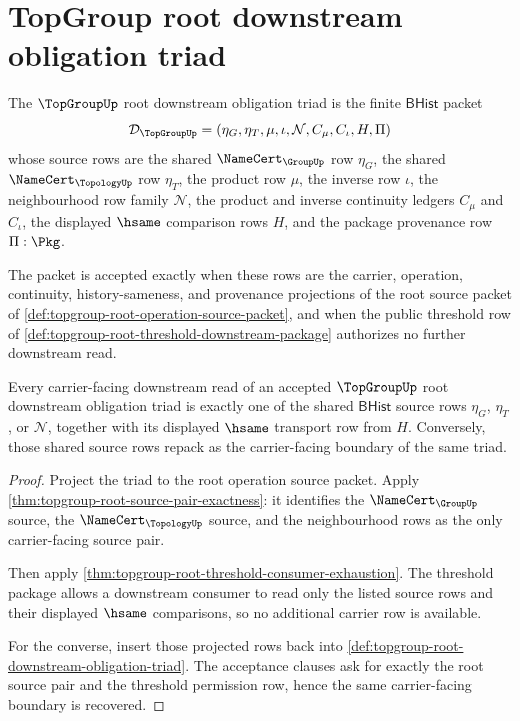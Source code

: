 \section{TopGroup root downstream obligation triad}
\label{sec:topgroup-root-downstream-obligation-triad}

\begin{definition}
\label{def:topgroup-root-downstream-obligation-triad}
The $\TopGroupUp$ root downstream obligation triad is the finite
$\mathsf{BHist}$ packet
$$
\mathcal{D}_{\TopGroupUp}
=
(\eta_G,\eta_T,\mu,\iota,\mathcal{N},C_{\mu},C_{\iota},H,\Pi)
$$
whose source rows are the shared $\NameCert_{\GroupUp}$ row $\eta_G$, the
shared $\NameCert_{\TopologyUp}$ row $\eta_T$, the product row $\mu$, the
inverse row $\iota$, the neighbourhood row family $\mathcal{N}$, the product
and inverse continuity ledgers $C_{\mu}$ and $C_{\iota}$, the displayed
$\hsame$ comparison rows $H$, and the package provenance row $\Pi:\Pkg$.

The packet is accepted exactly when these rows are the carrier, operation,
continuity, history-sameness, and provenance projections of the root source
packet of \autoref{def:topgroup-root-operation-source-packet}, and when the
public threshold row of
\autoref{def:topgroup-root-threshold-downstream-package} authorizes no further
downstream read.
\end{definition}

\begin{theorem}
\label{thm:topgroup-root-downstream-carrier-obligation}
Every carrier-facing downstream read of an accepted $\TopGroupUp$ root
downstream obligation triad is exactly one of the shared $\mathsf{BHist}$ source
rows $\eta_G$, $\eta_T$, or $\mathcal{N}$, together with its displayed $\hsame$
transport row from $H$. Conversely, those shared source rows repack as the
carrier-facing boundary of the same triad.
\end{theorem}
\begin{proof}
Project the triad to the root operation source packet. Apply
\autoref{thm:topgroup-root-source-pair-exactness}: it identifies the
$\NameCert_{\GroupUp}$ source, the $\NameCert_{\TopologyUp}$ source, and the
neighbourhood rows as the only carrier-facing source pair.

Then apply \autoref{thm:topgroup-root-threshold-consumer-exhaustion}. The
threshold package allows a downstream consumer to read only the listed source
rows and their displayed $\hsame$ comparisons, so no additional carrier row is
available.

For the converse, insert those projected rows back into
\autoref{def:topgroup-root-downstream-obligation-triad}. The acceptance clauses
ask for exactly the root source pair and the threshold permission row, hence the
same carrier-facing boundary is recovered.
\end{proof}


